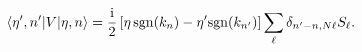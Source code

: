 \begin{equation}
\langle \eta',n'|V|\eta,n \rangle = \frac{\rm i}{2} \left[ \eta \, {\rm sgn}(k_n)-\eta'{\rm sgn}(k_{n'})\right]
\sum_{\ell} \delta_{n'-n,N\ell} S_{\ell} .
\label{d6}
\end{equation}


